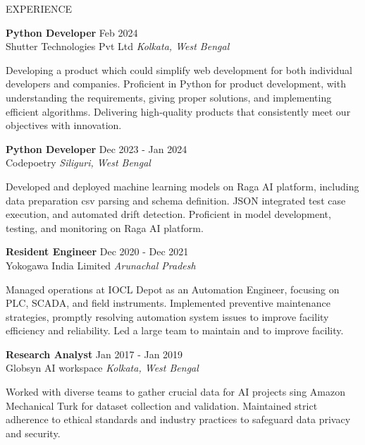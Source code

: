 \documentclass{resume} %
\begin{document}
\begin{rSection}{EXPERIENCE}

\textbf{Python Developer} \hfill Feb 2024\\
Shutter Technologies Pvt Ltd \hfill \textit{Kolkata, West Bengal}
\item {Developing a product which could simplify web development for both individual developers and companies. Proficient in Python for product development, with understanding the requirements, giving proper solutions, and implementing efficient algorithms. Delivering high-quality products that consistently meet our objectives with innovation. }
 
\textbf{Python Developer} \hfill Dec 2023 - Jan 2024\\
Codepoetry \hfill \textit{Siliguri, West Bengal}
\item Developed and deployed machine learning models on Raga AI platform, including data preparation csv parsing and schema definition. JSON integrated test case execution, and automated drift detection. Proficient in model development, testing, and monitoring on Raga AI platform.

\textbf{Resident Engineer} \hfill Dec 2020 - Dec 2021\\
Yokogawa India Limited \hfill \textit{Arunachal Pradesh}
\item Managed operations at IOCL Depot as an Automation Engineer, focusing on PLC, SCADA, and field instruments. Implemented preventive maintenance strategies, promptly resolving automation system issues to improve facility efficiency and reliability. Led a large team to maintain and to improve facility.

\textbf{Research Analyst} \hfill Jan 2017 - Jan 2019\\
Globsyn AI workspace \hfill \textit{Kolkata, West Bengal}
\item Worked with diverse teams to gather crucial data for AI projects sing Amazon Mechanical Turk for dataset collection and validation. Maintained strict adherence to ethical standards and industry practices to safeguard data privacy and security.
\end{rSection} 
\end{document}
